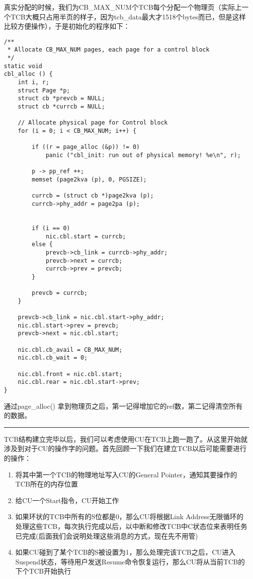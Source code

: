 \documentclass{article}
\newcommand{\funcname}[1]{{\ttfamily \small #1}}
\begin{document}
\begin{CJK*}{UTF8}{gkai}
\vspace{2em}

真实分配的时候，我们为CB\_MAX\_NUM个TCB每个分配一个物理页（实际上一个TCB大概只占用半页的样子，因为tcb\_data最大才1518个bytes而已，但是这样比较方便操作），于是初始化的程序如下：


\begin{lstlisting}[style=ccode, title={\scriptsize \ttfamily \bfseries kern/e100.c: cbl\_alloc()}]
/**
 * Allocate CB_MAX_NUM pages, each page for a control block
 */
static void
cbl_alloc () {
    int i, r;
    struct Page *p;
    struct cb *prevcb = NULL;
    struct cb *currcb = NULL;

    // Allocate physical page for Control block
    for (i = 0; i < CB_MAX_NUM; i++) {

        if ((r = page_alloc (&p)) != 0)
            panic ("cbl_init: run out of physical memory! %e\n", r);

        p -> pp_ref ++;
        memset (page2kva (p), 0, PGSIZE);

        currcb = (struct cb *)page2kva (p);
        currcb->phy_addr = page2pa (p);


        if (i == 0)
            nic.cbl.start = currcb;
        else {
            prevcb->cb_link = currcb->phy_addr;
            prevcb->next = currcb;
            currcb->prev = prevcb;
        }

        prevcb = currcb;
    }

    prevcb->cb_link = nic.cbl.start->phy_addr;
    nic.cbl.start->prev = prevcb;
    prevcb->next = nic.cbl.start;

    nic.cbl.cb_avail = CB_MAX_NUM;
    nic.cbl.cb_wait = 0;

    nic.cbl.front = nic.cbl.start;
    nic.cbl.rear = nic.cbl.start->prev;
}
\end{lstlisting}

通过\funcname{page\_alloc()} 拿到物理页之后，第一记得增加它的ref数，第二记得清空所有的数据。

\vspace{2em}
\hrule
\vspace{2em}

TCB结构建立完毕以后，我们可以考虑使用CU在TCB上跑一跑了。从这里开始就涉及到对于CU的操作字的问题。首先回顾一下我们在建立TCB以后可能需要进行的操作：

\begin{enumerate}
\item{将其中第一个TCB的物理地址写入CU的General Pointer，通知其要操作的TCB所在的内存位置}
\item{给CU一个Start指令，CU开始工作}
\item{如果环状的TCB中所有的S位都是0，那么CU将根据Link Address无限循环的处理这些TCB，每次执行完成以后，以中断和修改TCB中C状态位来表明任务已完成(后面我们会说明处理这些消息的方式，现在先不用管)}
\item{如果CU碰到了某个TCB的S被设置为1，那么处理完该TCB之后，CU进入Suspend状态，等待用户发送Resume命令恢复运行，那么CU将从当前TCB的下个TCB开始执行}
\end{enumerate}


\end{CJK*}
\end{document}
